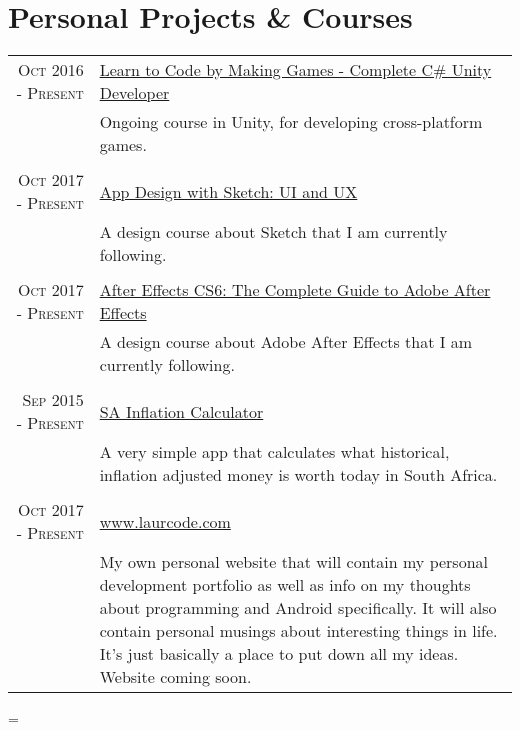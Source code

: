 \documentclass[a4paper,10pt,notitlepage]{article}
\newenvironment{absolutelynopagebreak}
  {\par\nobreak\vfil\penalty0\vfilneg
   \vtop\bgroup}
  {\par\xdef\tpd{\the\prevdepth}\egroup
   \prevdepth=\tpd}
\begin{document}
\begin{absolutelynopagebreak}
	
	\section{Personal Projects \& Courses}
	\begin{tabular}{r|p{11cm}}
		
		\textsc{Oct 2016 - Present} & \href{https://www.udemy.com/unitycourse/learn/v4/}{Learn to Code by Making Games - Complete C\# Unity Developer} \\&\footnotesize{Ongoing course in Unity, for developing cross-platform games.} \\
		
		\multicolumn{2}{c}{} \\
		\textsc{Oct 2017 - Present} &                                                                                                                  
		\href{https://www.udemy.com/app-design-with-sketch-ui-and-ux/}{App Design with Sketch: UI and UX}\\&\footnotesize{A design course about Sketch that I am currently following.} \\
		
		\multicolumn{2}{c}{} \\
		\textsc{Oct 2017 - Present} &                                                                                                                  
		\href{https://www.udemy.com/aftereffects/}{After Effects CS6: The Complete Guide to Adobe After Effects}\\&\footnotesize{A design course about Adobe After Effects that I am currently following.} \\
		
		\multicolumn{2}{c}{} \\
		\textsc{Sep 2015 - Present} &                                                                                                                  
		\href{https://play.google.com/store/apps/details?id=za.co.inflationcalc}{SA Inflation Calculator}\\&\footnotesize{A very simple app that calculates what historical, inflation adjusted money is worth today in South Africa.} \\
		
		\multicolumn{2}{c}{} \\
		\textsc{Oct 2017 - Present} &                                                                                                                  
		\href{www.laurcode.com}{www.laurcode.com}\\&\footnotesize{My own personal website that will contain my personal development portfolio as well as info on my thoughts about programming and Android specifically. It will also contain personal musings about interesting things in life. It's just basically a place to put down all my ideas. Website coming soon.} \\
		

\end{tabular}
\end{absolutelynopagebreak}
\end{document}
